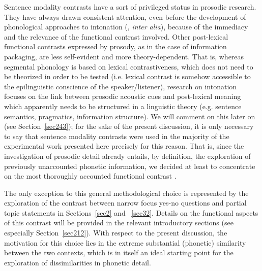 Sentence modality contrasts have a sort of privileged status in prosodic research. They have always drawn consistent attention, even before the development of phonological approaches to intonation (\citealt{kretschmer1938ursprung}, \textit{inter alia}), because of the immediacy and the relevance of the functional contrast involved. Other post-lexical functional contrasts expressed by prosody, as in the case of information packaging, are less self-evident and more theory-dependent. That is, whereas segmental phonology is based on lexical contrastiveness, which does not need to be theorized in order to be tested (i.e. lexical contrast is somehow accessible to the epilinguistic conscience of the speaker/listener), research on intonation focuses on the link between prosodic acoustic cues and post-lexical meaning which apparently needs to be structured in a linguistic theory (e.g. sentence semantics, pragmatics, information structure). We will comment on this later on (see Section~\ref{sec243}); for the sake of the present discussion, it is only necessary to say that sentence modality contrasts were used in the majority of the experimental work presented here precisely for this reason. That is, since the investigation of prosodic detail already entails, by definition, the exploration of previously unaccounted phonetic information, we decided at least to concentrate on the most thoroughly accounted functional contrast \citep{huddleston1994contrast,haan2002speaking}.

The only exception to this general methodological choice is represented by the exploration of the contrast between narrow focus yes-no questions and partial topic statements in Sections~\ref{sec2} and ~\ref{sec32}. Details on the functional aspects of this contrast will be provided in the relevant introductory sections (see especially Section~\ref{sec212}). With respect to the present discussion, the motivation for this choice lies in the extreme substantial (phonetic) similarity between the two contexts, which is in itself an ideal starting point for the exploration of dissimilarities in phonetic detail.